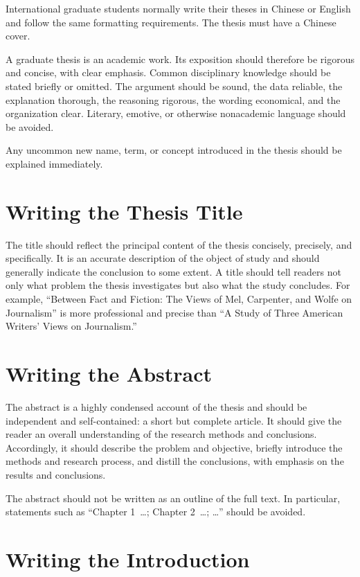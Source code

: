 \documentclass{thuthesis}
\begin{document}
International graduate students normally write their theses in Chinese or
English and follow the same formatting requirements. The thesis must have a
Chinese cover.

A graduate thesis is an academic work. Its exposition should therefore be
rigorous and concise, with clear emphasis. Common disciplinary knowledge should
be stated briefly or omitted. The argument should be sound, the data reliable,
the explanation thorough, the reasoning rigorous, the wording economical, and
the organization clear. Literary, emotive, or otherwise nonacademic language
should be avoided.

Any uncommon new name, term, or concept introduced in the thesis should be
explained immediately.

\section{Writing the Thesis Title}

The title should reflect the principal content of the thesis concisely,
precisely, and specifically. It is an accurate description of the object of
study and should generally indicate the conclusion to some extent. A title
should tell readers not only what problem the thesis investigates but also what
the study concludes. For example, ``Between Fact and Fiction: The Views of Mel,
Carpenter, and Wolfe on Journalism'' is more professional and precise than ``A
Study of Three American Writers' Views on Journalism.''

\section{Writing the Abstract}

The abstract is a highly condensed account of the thesis and should be
independent and self-contained: a short but complete article. It should give the
reader an overall understanding of the research methods and conclusions.
Accordingly, it should describe the problem and objective, briefly introduce the
methods and research process, and distill the conclusions, with emphasis on the
results and conclusions.

The abstract should not be written as an outline of the full text. In
particular,
statements such as ``Chapter 1~\ldots; Chapter 2~\ldots; \ldots'' should be
avoided.

\section{Writing the Introduction}
\end{document}
